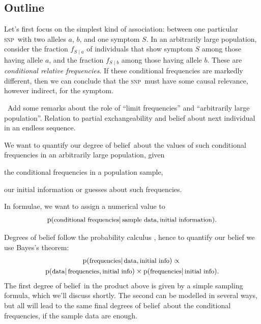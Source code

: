 \documentclass[\ifafour a4paper,12pt,\else a5paper,10pt,\fi%
onecolumn,oneside,article,%
british%
]{memoir}
\theoremstyle{remark}
\theoremstyle{innote}
\newcommand*{\citep}{\parencites}
\newcommand*{\pf}{\mathrm{p}}%
\renewcommand*{\|}{\mathpunct{|}}
\newcommand*{\puzzle}{\maltese}
\newcommand{\mynote}[1]{ {\color{notecolour}\puzzle\ #1}}
\newcommand*{\ptext}[1]{\text{\small #1}}
\newcommand*{\dob}{degree of belief}
\newcommand*{\dobs}{degrees of belief}
\newcommand*{\snp}{\textsc{snp}}
\newcommand*{\ya}{a}
\newcommand*{\yb}{b}
\begin{document}
\subsection{Outline}
\label{sec:method_outline}

Let's first focus on the simplest kind of association: between one
particular \snp\ with two alleles $\ya$, $\yb$, and one symptom $S$. In an
arbitrarily large population, consider the fraction $f_{S\|\ya}$ of
individuals that show symptom $S$ among those having allele $\ya$, and the
fraction $f_{S\|\yb}$ among those having allele $\yb$. These are
\emph{conditional relative frequencies}. If these conditional frequencies
are markedly different, then we can conclude that the \snp\ must have some
causal relevance, however indirect, for the symptom.

\mynote{Add some remarks about the role of \enquote{limit frequencies} and
  \enquote{arbitrarily large population}. Relation to partial
  exchangeability and belief about next individual in an endless sequence.}

We want to quantify our \dob\ about the values of such conditional
frequencies in an arbitrarily large population, given
\begin{enumerate*}[label=(\arabic*)]
\item the conditional frequencies in a population sample, \item our initial
  information or guesses about such frequencies.
\end{enumerate*} In formulae, we want to assign a numerical value to
\begin{equation*}
  \pf(\ptext{conditional frequencies} \| \ptext{sample data}, \ptext{initial information}).
\end{equation*}

Degrees of belief follow the probability calculus
\citep{jeffreys1939_r1983,cox1946,jaynes1994_r2003,hailperin1996}, hence to
quantify our belief we use Bayes's theorem:
\begin{multline}
  \label{eq:intuitive_Bayes}
  \pf(\ptext{frequencies} \| \ptext{data}, \ptext{initial info})
  \propto{}\\
  \pf(\ptext{data} \| \ptext{frequencies}, \ptext{initial info})
  \times
  \pf(\ptext{frequencies} \| \ptext{initial info}).
\end{multline}
The first \dob\ in the product above is given by a simple sampling formula,
which we'll discuss shortly. The second can be modelled in several ways,
but all will lead to the same final \dobs\ about the conditional
frequencies, if the sample data are enough.
\end{document}
